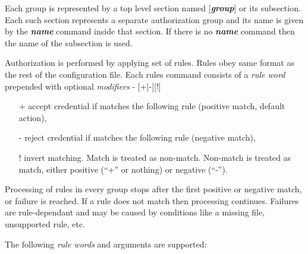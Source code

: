 \documentclass{article}
\begin{document}
Each group is represented by a top level section named
{[}\textbf{\textit{group}}{]} or its subsection. Each such section
represents a separate authorization group and its name is given by the
\textbf{\textit{name}} command inside that section. If there is no
\textbf{\textit{name}} command then the name of the subsection is
used.

Authorization is performed by applying set of rules. Rules obey same
format as the rest of the configuration file. Each rules command
consists of a \textit{rule word} prepended with optional
\textit{modifiers} - {[}+|-{]}{[}!{]}

\begin{itemize}
\item [+]accept credential if matches the following rule (positive match, default
action),
\item [-]reject credential if matches the following rule (negative match),
\item [!]invert matching. Match is treated as non-match. Non-match is treated
as match, either positive ({}``+'' or nothing) or negative ({}``-'').
\end{itemize}

Processing of rules in every group stops after the first positive or
negative match, or failure is reached. If a rule does not match then
processing continues.  Failures are rule-dependant and may be caused
by conditions like a missing file, unsupported rule, etc.

The following \textit{rule words} and arguments are supported:
\end{document}
